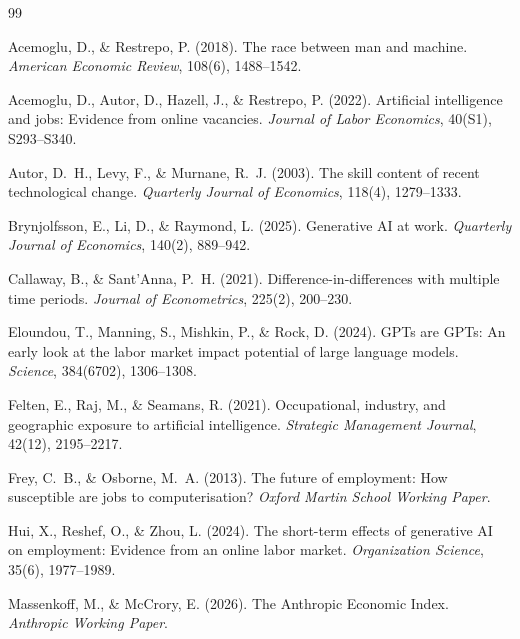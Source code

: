 \documentclass[12pt,a4paper]{article}
\begin{document}

\begin{thebibliography}{99}

Acemoglu, D., \& Restrepo, P. (2018).
The race between man and machine.
\textit{American Economic Review}, 108(6), 1488--1542.

Acemoglu, D., Autor, D., Hazell, J., \& Restrepo, P. (2022).
Artificial intelligence and jobs: Evidence from online vacancies.
\textit{Journal of Labor Economics}, 40(S1), S293--S340.

Autor, D.~H., Levy, F., \& Murnane, R.~J. (2003).
The skill content of recent technological change.
\textit{Quarterly Journal of Economics}, 118(4), 1279--1333.

Brynjolfsson, E., Li, D., \& Raymond, L. (2025).
Generative AI at work.
\textit{Quarterly Journal of Economics}, 140(2), 889--942.

Callaway, B., \& Sant'Anna, P.~H. (2021).
Difference-in-differences with multiple time periods.
\textit{Journal of Econometrics}, 225(2), 200--230.

Eloundou, T., Manning, S., Mishkin, P., \& Rock, D. (2024).
GPTs are GPTs: An early look at the labor market impact potential of large language models.
\textit{Science}, 384(6702), 1306--1308.

Felten, E., Raj, M., \& Seamans, R. (2021).
Occupational, industry, and geographic exposure to artificial intelligence.
\textit{Strategic Management Journal}, 42(12), 2195--2217.

Frey, C.~B., \& Osborne, M.~A. (2013).
The future of employment: How susceptible are jobs to computerisation?
\textit{Oxford Martin School Working Paper}.

Hui, X., Reshef, O., \& Zhou, L. (2024).
The short-term effects of generative AI on employment: Evidence from an online labor market.
\textit{Organization Science}, 35(6), 1977--1989.

Massenkoff, M., \& McCrory, E. (2026).
The Anthropic Economic Index.
\textit{Anthropic Working Paper}.


\end{thebibliography}
\end{document}
